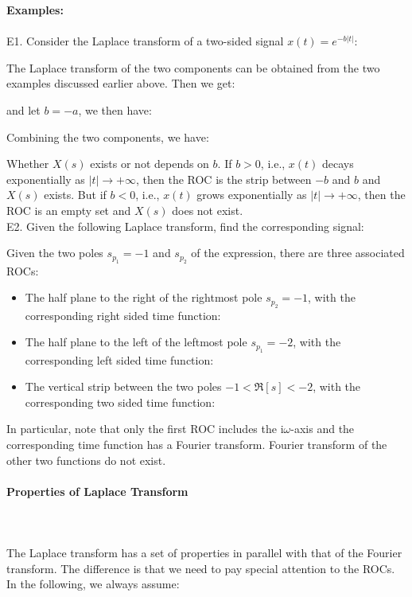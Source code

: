 	\begin{tcolorbox}[colframe=black,colback=white,sharp corners,breakable]
	\textbf{{\Large {}}Examples:}\\\\
	E1. Consider the Laplace transform of a two-sided signal $x(t)=e^{-b|t|}$:
	
	The Laplace transform of the two components can be obtained from the two examples discussed earlier above. Then we get:
	
	and let $b=-a$,  we then have:
	
	Combining the two components, we have:
	
	Whether $X(s)$ exists or not depends on $b$. If $b>0$, i.e., $x(t)$ decays exponentially as $|t| \rightarrow +\infty$, then the ROC is the strip between $-b$ and $b$ and $X(s)$ exists. But if $b<0$, i.e., $x(t)$ grows exponentially as  $|t| \rightarrow +\infty$, then the ROC is an empty set and $X(s)$ does not exist.\\
	
	E2. Given the following Laplace transform, find the corresponding signal:
	
	Given the two poles $s_{p_1}=-1$ and $s_{p_2}$ of the expression, there are three associated ROCs: 
	\begin{itemize}
		\item The half plane to the right of the rightmost pole $s_{p_2}=-1$, with the corresponding right sided time function:
		
		\item The half plane to the left of the leftmost pole $s_{p_1}=-2$, with the corresponding left sided time function:
		
		\item The vertical strip between the two poles $-1 < \Re[s] < -2$, with the corresponding two sided time function:
		 
	\end{itemize}
	In particular, note that only the first ROC includes the $\mathrm{i}\omega$-axis and the corresponding time function has a Fourier transform. Fourier transform of the other two functions do not exist.
	\end{tcolorbox}
	
	\pagebreak
	\paragraph{Properties of Laplace Transform}\label{properties of Laplace Transform}\mbox{}\\\\ 
	The Laplace transform has a set of properties in parallel with that of the Fourier transform. The difference is that we need to pay special attention to the ROCs. In the following, we always assume:
	
